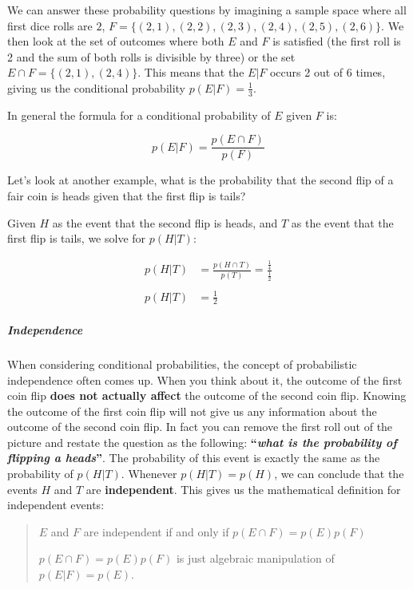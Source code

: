 We can answer these probability questions by imagining a sample space
where all first dice rolls are \textbf{\(2\)},
\textbf{\(F=\{(2,1),(2,2),(2,3),(2,4),(2,5),(2,6)\}\)}. We then look at
the set of outcomes where both \textbf{\(E\)} and \textbf{\(F\)} is
satisfied (the first roll is 2 and the sum of both rolls is divisible by
three) or the set \textbf{\(E \cap F=\{(2,1),(2,4)\}\)}. This means that
the \textbf{\(E|F\)} occurs 2 out of 6 times, giving us the conditional
probability \textbf{\(p(E|F)=\frac{1}{3}\)}.

In general the formula for a conditional probability of \(E\) given
\(F\) is:

\[
p(E|F)=\frac{p(E \cap F)}{p(F)}
\]

Let's look at another example, what is the probability that the second
flip of a fair coin is heads given that the first flip is tails?

Given \textbf{\(H\)} as the event that the second flip is heads, and
\textbf{\(T\)} as the event that the first flip is tails, we solve for
\textbf{\(p(H|T)\)}:

\[
\begin{aligned}
p(H|T)&=\frac{p(H \cap T)}{p(T)}=\frac{\frac{1}{4}}{\frac{1}{2}}\\\\
p(H|T)&=\frac{1}{2}
\end{aligned}
\]

\hypertarget{independence}{%
\subparagraph{Independence}\label{independence}}

When considering conditional probabilities, the concept of probabilistic
independence often comes up. When you think about it, the outcome of the
first coin flip \textbf{does not actually affect} the outcome of the
second coin flip. Knowing the outcome of the first coin flip will not
give us any information about the outcome of the second coin flip. In
fact you can remove the first roll out of the picture and restate the
question as the following: \textbf{``\emph{what is the probability of
flipping a heads}''}. The probability of this event is exactly the same
as the probability of \textbf{\(p(H|T)\)}. Whenever
\textbf{\(p(H|T)=p(H)\)}, we can conclude that the events \textbf{\(H\)}
and \textbf{\(T\)} are \textbf{independent}. This gives us the
mathematical definition for independent events:

\begin{quote}
\textbf{\(E\)} and \textbf{\(F\)} are independent if and only if
\(p(E \cap F)=p(E)p(F)\)

\textbf{\(p(E \cap F)=p(E)p(F)\)} is just algebraic manipulation of
\textbf{\(p(E|F)=p(E)\)}.
\end{quote}

